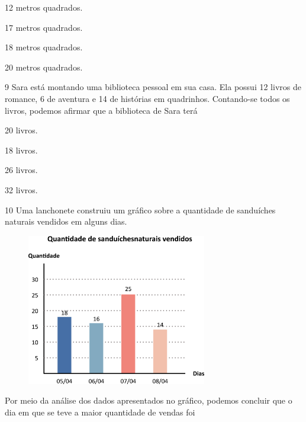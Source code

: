 \begin{multicols}{2}
\begin{escolha}
\item
  12 metros quadrados.
\item
  17 metros quadrados.
\item
  18 metros quadrados.
\item
  20 metros quadrados.
\end{escolha}
\end{multicols}

\num{9} Sara está montando uma biblioteca pessoal em sua casa. Ela possui 12 livros de romance, 6 de aventura e 14 de histórias em quadrinhos. Contando-se todos os livros, podemos afirmar que a biblioteca de Sara terá

\begin{multicols}{2}
\begin{escolha}
\item
  20 livros.
\item
  18 livros.
\item
  26 livros.
\item
  32 livros.
\end{escolha}
\end{multicols}

\num{10} Uma lanchonete construiu um gráfico sobre a quantidade de sanduíches
naturais vendidos em alguns dias.

\begin{figure}[htpb!]
\centering
\includegraphics[width=0.7\textwidth]{./media/image109.png}
\end{figure}

Por meio da análise dos dados apresentados no gráfico, podemos concluir que o dia em que se teve a maior quantidade de vendas foi

